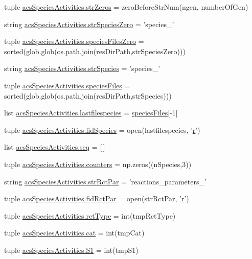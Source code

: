 \begin{DoxyCompactItemize}
\item 
tuple \hyperlink{a00103_ac53f52471f3cf1ef18465a07dc930dff}{acs\-Species\-Activities.\-str\-Zeros} = zero\-Before\-Str\-Num(ngen, number\-Of\-Gen)
\item 
string \hyperlink{a00103_a78927c369e0fe9deb29777c699af346f}{acs\-Species\-Activities.\-str\-Species\-Zero} = 'species\-\_\-'
\item 
tuple \hyperlink{a00103_a2f73b228eca2d5d0e45f781ccc21b253}{acs\-Species\-Activities.\-species\-Files\-Zero} = sorted(glob.\-glob(os.\-path.\-join(res\-Dir\-Path,str\-Species\-Zero)))
\item 
string \hyperlink{a00103_a7ad6c119fecb41b02823a95f334daa4c}{acs\-Species\-Activities.\-str\-Species} = 'species\-\_\-'
\item 
tuple \hyperlink{a00103_a7e3b3a6b0c9305e60758bf5d44e7b0f6}{acs\-Species\-Activities.\-species\-Files} = sorted(glob.\-glob(os.\-path.\-join(res\-Dir\-Path,str\-Species)))
\item 
list \hyperlink{a00103_ac7070acb2aaeb8965c57e81b6308ddd5}{acs\-Species\-Activities.\-lastfilespecies} = \hyperlink{a00028_af5703745c2c2a6af7f62da460994d9c2}{species\-Files}\mbox{[}-\/1\mbox{]}
\item 
tuple \hyperlink{a00103_a240d5b3cd72043528f4b674a8ba00a33}{acs\-Species\-Activities.\-fid\-Species} = open(lastfilespecies, '\hyperlink{a00031_ac862e7284527eb913b1351c8bfb8e079}{r}')
\item 
list \hyperlink{a00103_a50a8f7f4bae0fd037961d91206f5178c}{acs\-Species\-Activities.\-seq} = \mbox{[}$\,$\mbox{]}
\item 
tuple \hyperlink{a00103_a6afffdd046bbc3bc4fbee34b561fcae5}{acs\-Species\-Activities.\-counters} = np.\-zeros((n\-Species,3))
\item 
string \hyperlink{a00103_ab59af27efe5462ef13ae45fd7330d0b3}{acs\-Species\-Activities.\-str\-Rct\-Par} = 'reactions\-\_\-parameters\-\_\-'
\item 
tuple \hyperlink{a00103_a64247b23c199d0b0d0d60f02ec8682e3}{acs\-Species\-Activities.\-fid\-Rct\-Par} = open(str\-Rct\-Par, '\hyperlink{a00031_ac862e7284527eb913b1351c8bfb8e079}{r}')
\item 
tuple \hyperlink{a00103_abdc37f53b75138949fbbe9f9e42f1e6f}{acs\-Species\-Activities.\-rct\-Type} = int(tmp\-Rct\-Type)
\item 
tuple \hyperlink{a00103_a721a520fa04949579e29cb858dc00bf0}{acs\-Species\-Activities.\-cat} = int(tmp\-Cat)
\item 
tuple \hyperlink{a00103_a4ffac9566fa24baa2b27ccd97f9ffe1e}{acs\-Species\-Activities.\-S1} = int(tmp\-S1)

\end{DoxyCompactItemize}
